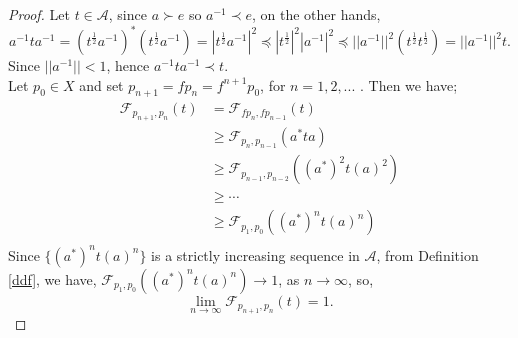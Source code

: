 \documentclass[10pt,a4paper]{amsart}
\begin{document}
\begin{proof}
	Let $t \in \mathcal{A}$, since $a\succ e$ so $a^{-1}\prec e$, on the other hands, 
	$$a^{-1}ta^{-1}=(t^{\frac{1}{2}}a^{-1})^*(t^{\frac{1}{2}}a^{-1})=| t^{\frac{1}{2}}a^{-1}|^2\preceq |t^{\frac{1}{2}}|^2|a^{-1}|^2\preceq ||a^{-1}||^2(t^{\frac{1}{2}}t^{\frac{1}{2}})=||a^{-1}||^2t.$$
	Since $||a^{-1}||<1$, hence $a^{-1}ta^{-1}\prec t.$\\
	Let $p_0\in X$ and set $p_{n+1}=fp_n=f^{n+1}p_0$, for $n= 1,2, ...$ . Then we have;
	\begin{align*}
		\mathcal{F}_{p_{n+1},p_{n}}(t)&=\mathcal{F}_{fp_{n},fp_{n-1}}(t)\\
		&\geq\mathcal{F}_{p_{n},p_{n-1}}(a^*ta)\\
		&\geq\mathcal{F}_{p_{n-1},p_{n-2}}\left( (a^*)^2t(a)^2\right)\\
		&\geq \cdots\\
		&\geq\mathcal{F}_{p_{1},p_{0}}\left( (a^*)^nt(a)^n\right)\\
	\end{align*}
	Since $\{ (a^*)^nt(a)^n\}$ is a strictly increasing sequence in $\mathcal{A}$, from Definition \ref{ddf}, we have, $\mathcal{F}_{p_{1},p_{0}}\left( (a^*)^nt(a)^n\right) \to 1$, as $n\to \infty$, so, 
	\begin{equation*}
		\lim_{n\to \infty} \mathcal{F}_{p_{n+1},p_{n}}(t)=1.
	\end{equation*}
	

\end{proof}
\end{document}
